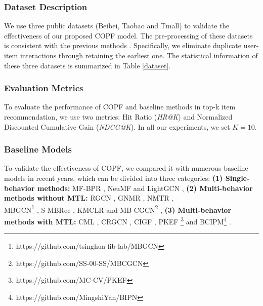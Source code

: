 \subsubsection{Dataset Description}
We use three public datasets (Beibei, Taobao and Tmall) to validate the effectiveness of our proposed COPF model. The pre-processing of these datasets is consistent with the previous methods \cite{cigf,pkef}. Specifically, we eliminate duplicate user-item interactions through retaining the earliest one. The statistical information of these three datasets is summarized in Table \ref{dataset}. 

\subsubsection{Evaluation Metrics}
To evaluate the performance of COPF and baseline methods in top-k item recommendation, we use two metrics: Hit Ratio (\textit{HR@K}) and Normalized Discounted Cumulative Gain (\textit{NDCG@K}). In all our experiments, we set $K = 10$.


\subsubsection{Baseline Models}
To validate the effectiveness of COPF, we compared it with numerous baseline models in recent years, which can be divided into three categories: \textbf{(1) Single-behavior methods:} MF-BPR \cite{bpr}, NeuMF \cite{ncf} and LightGCN \cite{lightgcn}, \textbf{(2) Multi-behavior methods without MTL:} RGCN \cite{RGNN}, GNMR \cite{gnmr}, NMTR \cite{nmtr}, \\ MBGCN\footnote{https://github.com/tsinghua-fib-lab/MBGCN} \cite{mbgcn}, S-MBRec \cite{smbrec}, KMCLR \cite{kmclr} and MB-CGCN\footnote{https://github.com/SS-00-SS/MBCGCN} \cite{mbcgcn}, \textbf{(3) Multi-behavior methods with MTL:} CML \cite{CML}, CRGCN \cite{crgcn}, CIGF \cite{cigf}, PKEF \footnote{https://github.com/MC-CV/PKEF} \cite{pkef} and BCIPM\footnote{https://github.com/MingshiYan/BIPN} \cite{bipn}.


